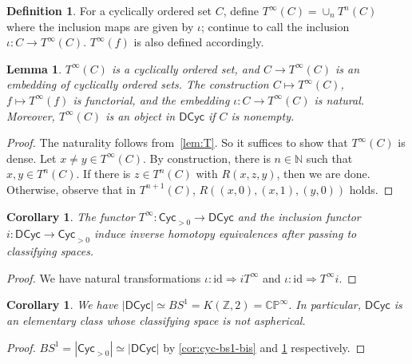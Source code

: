 \documentclass{amsart}
\theoremstyle{plain}
\newtheorem{cor}[thm]{Corollary}
\newtheorem{lem}[thm]{Lemma}
\theoremstyle{definition}
\newtheorem{Def}[thm]{Definition}
\newcommand{\ints}{\mathbb{Z}}
\newcommand{\cpx}{\mathbb{C}}
\newcommand{\nats}{\mathbb{N}}
\newcommand{\id}{\mathrm{id}}
\newcommand{\Cyc}{\mathsf{Cyc}}
\newcommand{\pjv}{\mathbb{P}}
\newcommand{\DCyc}{\mathsf{DCyc}}
\begin{document}
\begin{Def}
For a cyclically ordered set $C$, define $T^\infty(C) = \cup_n T^n(C)$ where the inclusion maps are given by $\iota$; continue to call the inclusion $\iota: C \to T^\infty(C)$. $T^\infty(f)$ is also defined accordingly.
\end{Def}

\begin{lem}\label{lem:Tinf}
 $T^\infty(C)$ is a cyclically ordered set, and $C \to T^\infty(C)$ is an embedding of cyclically ordered sets. The construction $C \mapsto T^\infty(C)$, $f\mapsto T^\infty(f)$ is functorial, and the embedding $\iota: C \to T^\infty(C)$ is natural. Moreover, $T^\infty(C)$ is an object in $\DCyc$ if $C$ is nonempty.
\end{lem}
\begin{proof}
 The naturality follows from~\cref{lem:T}. So it suffices to show that $T^\infty(C)$ is dense. Let $x \neq y \in T^\infty(C)$. By construction, there is $n\in\nats$ such that $x, y \in T^n(C)$. If there is $z \in T^n(C)$ with $R(x,z,y)$, then we are done. Otherwise, observe that in $T^{n+1}(C)$, $R((x,0), (x,1), (y,0))$ holds.
\end{proof}

\begin{cor}\label{cor:fraisse-heq}
The functor $T^\infty : \Cyc_{>0} \to \DCyc$ and the inclusion functor $i : \DCyc \to \Cyc_{>0}$ induce inverse homotopy equivalences after passing to classifying spaces.
\end{cor}
\begin{proof}
We have natural transformations $\iota: \id \Rightarrow iT^\infty$ and $\iota: \id \Rightarrow T^\infty i$.
\end{proof}

\begin{cor}\label{cor:maincor}
We have $|\DCyc| \simeq BS^1 = K(\ints,2) = \cpx \pjv^\infty$. In particular, $\DCyc$ is an elementary class whose classifying space is not aspherical.
\end{cor}
\begin{proof}
$BS^1 = |\Cyc_{>0}| \simeq |\DCyc|$ by \cref{cor:cyc-bs1-bis} and \cref{cor:fraisse-heq} respectively.
\end{proof}
\end{document}
